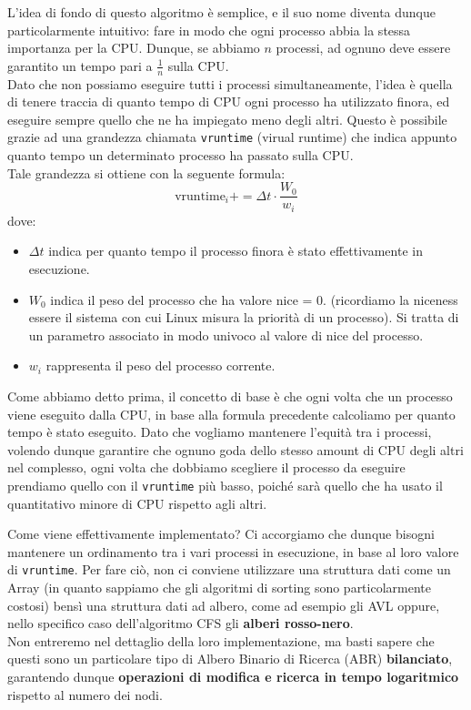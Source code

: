 \documentclass[12pt]{report}
\begin{document}
	L'idea di fondo di questo algoritmo è semplice, e il suo nome diventa dunque particolarmente intuitivo: fare in modo che ogni processo abbia la stessa importanza per la CPU. Dunque, se abbiamo $n$ processi, ad ognuno deve essere garantito un tempo pari a $\frac{1}{n}$ sulla CPU.\\
	Dato che non possiamo eseguire tutti i processi simultaneamente, l'idea è quella di tenere traccia di quanto tempo di CPU ogni processo ha utilizzato finora, ed eseguire sempre quello che ne ha impiegato meno degli altri.
	Questo è possibile grazie ad una grandezza chiamata \texttt{vruntime} (virual runtime) che indica appunto quanto tempo un determinato processo ha passato sulla CPU.\\
	Tale grandezza si ottiene con la seguente formula:
	\[
		\text{vruntime}_i += \Delta t \cdot \frac{W_0}{w_i}
	\]
	dove:
	\begin{itemize}
		\item $\Delta t$ indica per quanto tempo il processo finora è stato effettivamente in esecuzione.
		
		\item $W_0$ indica il peso del processo che ha valore nice = 0. (ricordiamo la niceness essere il sistema con cui Linux misura la priorità di un processo). Si tratta di un parametro associato in modo univoco al valore di nice del processo.
		
		\item $w_i$ rappresenta il peso del processo corrente.
	\end{itemize}
	Come abbiamo detto prima, il concetto di base è che ogni volta che un processo viene eseguito dalla CPU, in base alla formula precedente calcoliamo per quanto tempo è stato eseguito. Dato che vogliamo mantenere l'equità tra i processi, volendo dunque garantire che ognuno goda dello stesso amount di CPU degli altri nel complesso, ogni volta che dobbiamo scegliere il processo da eseguire prendiamo quello con il \texttt{vruntime} più basso, poiché sarà quello che ha usato il quantitativo minore di CPU rispetto agli altri.
	
	\begin{osservazione}{Come viene effettivamente implementato?}{}
		Ci accorgiamo che dunque bisogni mantenere un ordinamento tra i vari processi in esecuzione, in base al loro valore di \texttt{vruntime}. Per fare ciò, non ci conviene utilizzare una struttura dati come un Array (in quanto sappiamo che gli algoritmi di sorting sono particolarmente costosi) bensì una struttura dati ad albero, come ad esempio gli AVL oppure, nello specifico caso dell'algoritmo CFS gli \textbf{alberi rosso-nero}.\\
		Non entreremo nel dettaglio della loro implementazione, ma basti sapere che questi sono un particolare tipo di Albero Binario di Ricerca (ABR) \textbf{bilanciato}, garantendo dunque \textbf{operazioni di modifica e ricerca in tempo logaritmico} rispetto al numero dei nodi.
	\end{osservazione}
	
\end{document}
